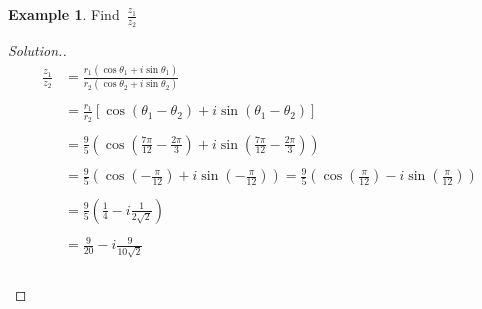 \documentclass[11pt,a4paper]{article}
\theoremstyle{definition}
\newtheorem{example}[thm]{Example}
\newenvironment{solution}
  {\renewcommand{\qedsymbol}{}\begin{proof}[\textit{Solution}.]}
  {\end{proof}}
\begin{document}
\begin{example}
Find $\, \frac{z_1}{z_2}$
\end{example}

\begin{solution}
\begin{align*}
\frac{z_1}{z_2} & = \frac{r_1\left(\cos \theta_1 + i\sin \theta_1\right)}{r_2\left( \cos \theta_2 + i\sin \theta_2\right)}\\\\
& = \frac{r_1}{r_2}\left[\cos \left(\theta_1-\theta_2\right) + i\sin \left(\theta_1-\theta_2\right)\right]\\\\
& = \frac{9}{5}\left( \cos \left(\frac{7\pi}{12} - \frac{2\pi}{3}\right) + i \sin \left(\frac{7\pi}{12} - \frac{2\pi}{3}\right)\right)\\\\
& = \frac{9}{5}\left( \cos \left( - \frac{\pi}{12}\right) + i \sin \left( - \frac{\pi}{12}\right)\right)
 = \frac{9}{5}\left( \cos \left(\frac{\pi}{12}\right) - i \sin \left(\frac{\pi}{12}\right)\right)\\\\
& = \frac{9}{5}\left( \frac{1}{4} - i\frac{1}{2\sqrt{2}}\right)\\\\
& = \frac{9}{20}- i\frac{9}{10\sqrt{2}}\\\\\\\\\
\end{align*}
\end{solution}
\end{document}
